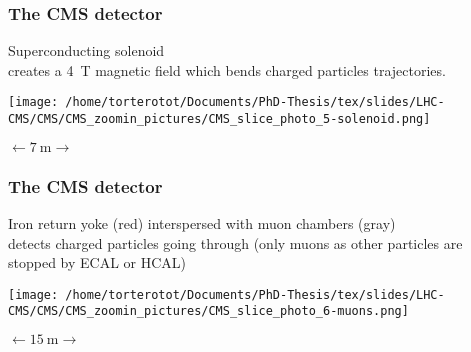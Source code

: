 \begin{frame}\addtocounter{framenumber}{-1}
\frametitle{The CMS detector}
\begin{center}
Superconducting solenoid\\
creates a \SI{4}{\tesla} magnetic field which bends charged particles trajectories.

\texttt{[image: /home/torterotot/Documents/PhD-Thesis/tex/slides/LHC-CMS/CMS/CMS\_zoomin\_pictures/CMS\_slice\_photo\_5-solenoid.png]}

$\longleftarrow \SI{7}{\meter} \longrightarrow$
\end{center}
\end{frame}
\begin{frame}\addtocounter{framenumber}{-1}
\frametitle{The CMS detector}
\begin{center}
Iron return yoke (red) interspersed with muon chambers (gray)\\
detects charged particles going through (only muons as other particles are stopped by ECAL or HCAL)

\texttt{[image: /home/torterotot/Documents/PhD-Thesis/tex/slides/LHC-CMS/CMS/CMS\_zoomin\_pictures/CMS\_slice\_photo\_6-muons.png]}

$\longleftarrow \SI{15}{\meter} \longrightarrow$
\end{center}
\end{frame}